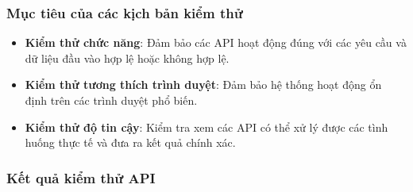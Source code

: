 \subsubsection{Mục tiêu của các kịch bản kiểm thử}
\begin{itemize}
    \item \textbf{Kiểm thử chức năng}: Đảm bảo các API hoạt động đúng với các yêu cầu và dữ liệu đầu vào hợp lệ hoặc không hợp lệ. 
    \item \textbf{Kiểm thử tương thích trình duyệt}: Đảm bảo hệ thống hoạt động ổn định trên các trình duyệt phổ biến.
    \item \textbf{Kiểm thử độ tin cậy}: Kiểm tra xem các API có thể xử lý được các tình huống thực tế và đưa ra kết quả chính xác.
\end{itemize}
\subsubsection{Kết quả kiểm thử API}
